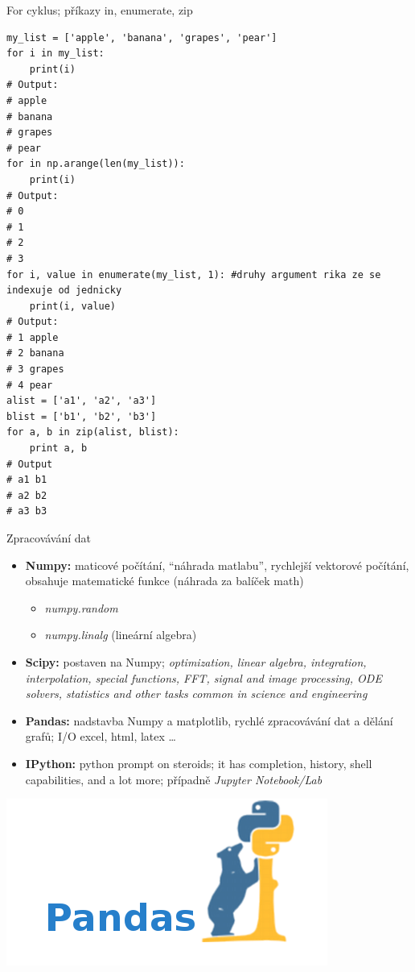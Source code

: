 \documentclass[10pt]{beamer}
\begin{document}
\begin{frame}[fragile]{For cyklus; příkazy in, enumerate, zip}
\begin{lstlisting}[columns=flexible]
my_list = ['apple', 'banana', 'grapes', 'pear']
for i in my_list:
    print(i)
# Output:
# apple
# banana
# grapes
# pear
for in np.arange(len(my_list)):
    print(i)
# Output:
# 0
# 1
# 2
# 3
for i, value in enumerate(my_list, 1): #druhy argument rika ze se indexuje od jednicky
    print(i, value)
# Output:
# 1 apple
# 2 banana
# 3 grapes
# 4 pear
alist = ['a1', 'a2', 'a3']
blist = ['b1', 'b2', 'b3']
for a, b in zip(alist, blist):
    print a, b
# Output
# a1 b1
# a2 b2
# a3 b3
\end{lstlisting}
\end{frame}

\begin{frame}{Zpracovávání dat}
    \begin{itemize}
        \item \textbf{Numpy:} maticové počítání, ``náhrada matlabu'', rychlejší vektorové počítání, obsahuje matematické funkce (náhrada za balíček math)
            \begin{itemize}
                \item \emph{numpy.random}
                \item \emph{numpy.linalg} (lineární algebra)
            \end{itemize}
        \item \textbf{Scipy:} postaven na Numpy; \emph{optimization, linear algebra, integration, interpolation, special functions, FFT, signal and image processing, ODE solvers, statistics and other tasks common in science and engineering} 
        \item \textbf{Pandas:} nadstavba Numpy a matplotlib, rychlé zpracovávání dat a dělání grafů; I/O excel, html, latex \dots
        \item \textbf{IPython:} python prompt on steroids; it has completion, history, shell capabilities, and a lot more; případně \emph{Jupyter Notebook/Lab}
    \end{itemize}
    \begin{center}
        \includegraphics[height=.2\textheight]{pandas.png}
    \end{center}
\end{frame}
\end{document}
